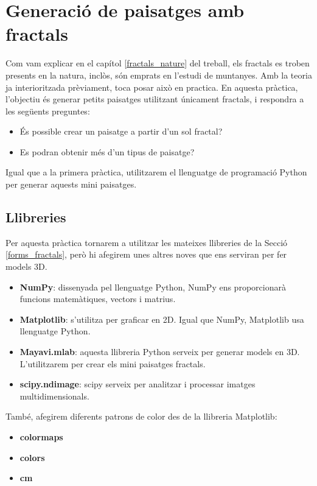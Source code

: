 \documentclass[12pt,a4paper]{report}
\begin{document}
\section{Generació de paisatges amb fractals}
Com vam explicar en el capítol \ref{fractals_nature} del treball, els fractals es troben presents en la natura, inclòs, són emprats en l'estudi de muntanyes. Amb la teoria ja interioritzada prèviament, toca posar això en practica. En aquesta pràctica, l'objectiu és generar petits paisatges utilitzant únicament fractals, i respondra a les següents preguntes: 

\begin{itemize}
\item És possible crear un paisatge a partir d'un sol fractal?
\item Es podran obtenir més d’un tipus de paisatge?
\end{itemize}

Igual que a la primera pràctica, utilitzarem el llenguatge de programació Python per generar aquests mini paisatges.

\subsection{Llibreries}
Per aquesta pràctica tornarem a utilitzar les mateixes llibreries de la Secció \ref{forms_fractals}, però hi afegirem unes altres noves que ens serviran per fer models 3D.

{
}

\begin{itemize}
\item \textbf{NumPy}: dissenyada pel llenguatge Python, NumPy ens proporcionarà funcions matemàtiques, vectors i matrius. 
\item \textbf{Matplotlib}: s'utilitza per graficar en 2D. Igual que NumPy, Matplotlib usa llenguatge Python.
\item \textbf{Mayavi.mlab}: aquesta llibreria Python serveix per generar models en 3D. L'utilitzarem per crear els mini paisatges fractals.
\item \textbf{scipy.ndimage}: scipy serveix per analitzar i processar imatges multidimensionals.
\end{itemize} 

També, afegirem diferents patrons de color des de la llibreria Matplotlib:

\begin{itemize}
\item \textbf{colormaps}
\item \textbf{colors}
\item \textbf{cm}
\end{itemize} 
\end{document}
